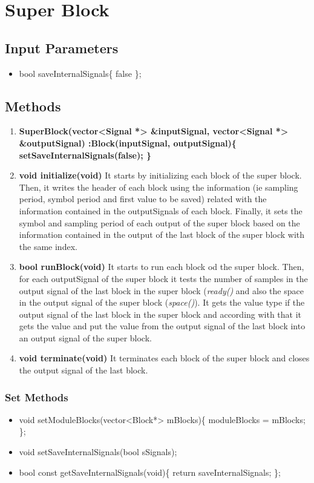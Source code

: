 \clearpage

\section{Super Block}


\subsection*{Input Parameters}
\begin{itemize}
  \item bool saveInternalSignals\{ false \};
\end{itemize}



\subsection*{Methods}
\begin{enumerate}
  \item \textbf{SuperBlock(vector<Signal *> \&inputSignal, vector<Signal *> \&outputSignal) :Block(inputSignal, outputSignal)\{ setSaveInternalSignals(false); \}}
  
  \item \textbf{void initialize(void)}
  It starts by initializing each block of the super block. Then, it writes the header of each block using the information (ie sampling period, symbol period and first value to be saved) related with the information contained in the outputSignals of each block. Finally, it sets the symbol and sampling period of each output of the super block based on the information contained in the output of the last block of the super block with the same index.

  \item \textbf{bool runBlock(void)}
  It starts to run each block od the super block. Then, for each outputSignal of the super block it tests the number of samples in the output signal of the last block in the super block (\textit{ready()} and also the space in the output signal of the super block (\textit{space()}). It gets the value type if the output signal of the last block in the super block and according with that it gets the value and put the value from the output signal of the last block into an output signal of the super block.
  
  \item \textbf{void terminate(void)}
  It terminates each block of the super block and closes the output signal of the last block.
  
\end{enumerate}
  

\subsubsection{Set Methods}
\begin{itemize}
  \item void setModuleBlocks(vector<Block*> mBlocks)\{ moduleBlocks = mBlocks; \};
  \item void setSaveInternalSignals(bool sSignals);
  \item bool const getSaveInternalSignals(void)\{ return saveInternalSignals; \};
\end{itemize}



